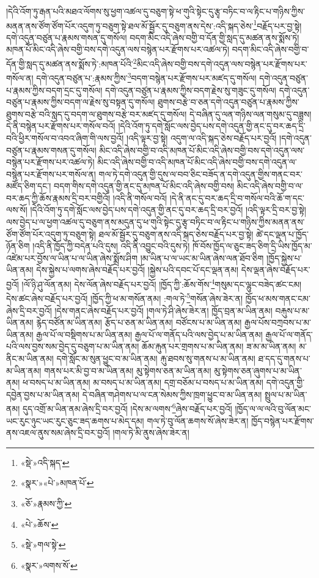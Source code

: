 །དེའི་འོག་ཏུ་རྒན་པའི་མཐའ་ལོགས་སུ་ཕྱག་འཚལ་དུ་བཅུག་སྟེ་ཕ་གུའི་སྟེང་དུ་རྩྭ་བཏིང་བ་ལ་རྟིང་པ་གཉིས་ཀྱིས་མནན་ནས་ཙོག་ཙོག་པོར་འདུག་ཏུ་བཅུག་སྟེ་ཐལ་མོ་སྦྱོར་དུ་བཅུག་ནས་དེས་:འདི་སྐད་ཅེས་\footnote{«སྡེ་»འདི་སྐད་}བརྗོད་པར་བྱ་སྟེ། དགེ་འདུན་བཙུན་པ་རྣམས་གསན་དུ་གསོལ། བདག་མིང་འདི་ཞེས་བགྱི་བ་དོན་གྱི་སླད་དུ་མཚན་ནས་སྨོས་ཏེ། མཁན་པོ་མིང་འདི་ཞེས་བགྱི་བས་དགེ་འདུན་ལས་བསྙེན་པར་རྫོགས་པར་འཚལ་ཏེ། བདག་མིང་འདི་ཞེས་བགྱི་བ་དོན་གྱི་སླད་དུ་མཚན་ནས་སྨོས་ཏེ་:མཁན་པོའི་\footnote{«སྣར་»«པེ་»མཁན་པོ་}མིང་འདི་ཞེས་བགྱི་བས་དགེ་འདུན་ལས་བསྙེན་པར་རྫོགས་པར་གསོལ་ན། དགེ་འདུན་བཙུན་པ་:རྣམས་ཀྱིས་\footnote{«ཅོ་»རྣམས་ཀྱི་}བདག་བསྙེན་པར་རྫོགས་པར་མཛད་དུ་གསོལ། དགེ་འདུན་བཙུན་པ་རྣམས་ཀྱིས་བདག་དྲང་དུ་གསོལ། དགེ་འདུན་བཙུན་པ་རྣམས་ཀྱིས་བདག་རྗེས་སུ་གཟུང་དུ་གསོལ། དགེ་འདུན་བཙུན་པ་རྣམས་ཀྱིས་བདག་ལ་རྗེས་སུ་བསྟན་དུ་གསོལ། ཐུགས་བརྩེ་བ་ཅན་དགེ་འདུན་བཙུན་པ་རྣམས་ཀྱིས་ཐུགས་བརྩེ་བའི་སླད་དུ་བདག་ལ་ཐུགས་བརྩེ་བར་མཛད་དུ་གསོལ། དེ་བཞིན་དུ་ལན་གཉིས་ལན་གསུམ་དུ་བཟླས། དེ་ནི་བསྙེན་པར་རྫོགས་པར་གསོལ་བའོ། །དེའི་འོག་ཏུ་དགེ་སློང་ལས་བྱེད་པས་དགེ་འདུན་གྱི་ནང་དུ་བར་ཆད་དྲི་བའི་ཕྱིར་གསོལ་བ་འབའ་ཞིག་གི་ལས་བྱའོ། །འདི་ལྟར་བྱ་སྟེ། འདུག་ལ་འདི་སྐད་ཅེས་བརྗོད་པར་བྱའོ། །དགེ་འདུན་བཙུན་པ་རྣམས་གསན་དུ་གསོལ། མིང་འདི་ཞེས་བགྱི་བ་འདི་མཁན་པོ་མིང་འདི་ཞེས་བགྱི་བས་དགེ་འདུན་ལས་བསྙེན་པར་རྫོགས་པར་འཚལ་ཏེ། མིང་འདི་ཞེས་བགྱི་བ་འདི་མཁན་པོ་མིང་འདི་ཞེས་བགྱི་བས་དགེ་འདུན་ལ་བསྙེན་པར་རྫོགས་པར་གསོལ་ན། གལ་ཏེ་དགེ་འདུན་གྱི་དུས་ལ་བབ་ཅིང་བཟོད་ན་དགེ་འདུན་གྱིས་གནང་བར་མཛོད་ཅིག་དང་། བདག་གིས་དགེ་འདུན་གྱི་ནང་དུ་མཁན་པོ་མིང་འདི་ཞེས་བགྱི་བས། མིང་འདི་ཞེས་བགྱི་བ་ལ་བར་ཆད་ཀྱི་ཆོས་རྣམས་དྲི་བར་བགྱིའོ། །འདི་ནི་གསོལ་བའོ། །དེ་ནི་ནང་དུ་བར་ཆད་དྲི་བ་གསོལ་བའི་ཆོ་ག་དང་ལས་སོ། །དེའི་འོག་ཏུ་དགེ་སློང་ལས་བྱེད་པས་དགེ་འདུན་གྱི་ནང་དུ་བར་ཆད་དྲི་བར་བྱའོ། །འདི་ལྟར་དྲི་བར་བྱ་སྟེ། ལས་བྱེད་པ་ལ་ཕྱག་འཚལ་དུ་བཅུག་ནས་མདུན་དུ་ཕ་གུའི་སྟེང་དུ་རྩྭ་བཏིང་བ་ལ་རྟིང་པ་གཉིས་ཀྱིས་མནན་ནས་ཙོག་ཙོག་པོར་འདུག་ཏུ་བཅུག་སྟེ། ཐལ་མོ་སྦྱོར་དུ་བཅུག་ནས་འདི་སྐད་ཅེས་བརྗོད་པར་བྱ་སྟེ། ཚེ་དང་ལྡན་པ་ཁྱོད་ཉོན་ཅིག །འདི་ནི་ཁྱོད་ཀྱི་བདེན་པའི་དུས། འདི་ནི་འབྱུང་བའི་དུས་ཏེ། ཁོ་བོས་ཁྱོད་ལ་ཅུང་ཟད་ཅིག་དྲི་ཡིས་ཁྱོད་མ་འཛེམ་པར་བྱོས་ལ་ཡིན་པ་ལ་ཡིན་ཞེས་སྨྲོས་ཤིག །མ་ཡིན་པ་ལ་ཡང་མ་ཡིན་ཞེས་ལན་ཐོབ་ཅིག །ཁྱོད་སྐྱེས་པ་ཡིན་ནམ། དེས་སྐྱེས་པ་ལགས་ཞེས་བརྗོད་པར་བྱའོ། །སྐྱེས་པའི་དབང་པོ་དང་ལྡན་ནམ། དེས་ལྡན་ཞེས་བརྗོད་པར་བྱའོ། །ལོ་ཉི་ཤུ་ལོན་ནམ། དེས་ལོན་ཞེས་བརྗོད་པར་བྱའོ། །ཁྱོད་ཀྱི་:ཆོས་གོས་\footnote{«པེ་»ཆོས་}གསུམ་དང་ལྷུང་བཟེད་ཚང་ངམ། དེས་ཚང་ཞེས་བརྗོད་པར་བྱའོ། །ཁྱོད་ཀྱི་ཕ་མ་གསོན་ནམ། :གལ་ཏེ་\footnote{«སྡེ་»གལ་སྟེ་}གསོན་ཞེས་ཟེར་ན། ཁྱོད་ཕ་མས་གནང་ངམ་ཞེས་དྲི་བར་བྱའོ། །དེས་གནང་ཞེས་བརྗོད་པར་བྱའོ། །གལ་ཏེ་ཤི་ཞེས་ཟེར་ན། ཁྱོད་བྲན་མ་ཡིན་ནམ། བརྐུས་པ་མ་ཡིན་ནམ། རྙེད་བཙོན་མ་ཡིན་ནམ། རྩོད་པ་ཅན་མ་ཡིན་ནམ། བཙོངས་པ་མ་ཡིན་ནམ། རྒྱལ་པོས་བཀྲབས་པ་མ་ཡིན་ནམ། རྒྱལ་པོ་ལ་བསྡིགས་པ་མ་ཡིན་ནམ། རྒྱལ་པོ་ལ་གནོད་པའི་ལས་བྱེད་པ་མ་ཡིན་ནམ། རྒྱལ་པོ་ལ་གནོད་པའི་ལས་བྱས་སམ་བྱེད་དུ་བཅུག་པ་མ་ཡིན་ནམ། ཆོམ་རྐུན་པར་གྲགས་པ་མ་ཡིན་ནམ། ཟ་མ་མ་ཡིན་ནམ། མ་ནིང་མ་ཡིན་ནམ། དགེ་སློང་མ་སུན་ཕྱུང་བ་མ་ཡིན་ནམ། རྐུ་ཐབས་སུ་གནས་པ་མ་ཡིན་ནམ། ཐ་དད་དུ་གནས་པ་མ་ཡིན་ནམ། གནས་པར་མི་བྱ་བ་མ་ཡིན་ནམ། མུ་སྟེགས་ཅན་མ་ཡིན་ནམ། མུ་སྟེགས་ཅན་ཞུགས་པ་མ་ཡིན་ནམ། ཕ་བསད་པ་མ་ཡིན་ནམ། མ་བསད་པ་མ་ཡིན་ནམ། དགྲ་བཅོམ་པ་བསད་པ་མ་ཡིན་ནམ། དགེ་འདུན་གྱི་དབྱེན་བྱས་པ་མ་ཡིན་ནམ། དེ་བཞིན་གཤེགས་པ་ལ་ངན་སེམས་ཀྱིས་ཁྲག་ཕྱུང་བ་མ་ཡིན་ནམ། སྤྲུལ་པ་མ་ཡིན་ནམ། དུད་འགྲོ་མ་ཡིན་ནམ་ཞེས་དྲི་བར་བྱའོ། །དེས་མ་ལགས་\footnote{«སྣར་»ལགས་སོ་}ཞེས་བརྗོད་པར་བྱའོ། །ཁྱོད་ལ་ལ་ལའི་བུ་ལོན་མང་ཡང་རུང་ཉུང་ཡང་རུང་ཅུང་ཟད་ཆགས་པ་མེད་དམ། གལ་ཏེ་བུ་ལོན་ཆགས་སོ་ཞེས་ཟེར་ན། ཁྱོད་བསྙེན་པར་རྫོགས་ནས་འཇལ་ནུས་སམ་ཞེས་དྲི་བར་བྱའོ། །གལ་ཏེ་མི་ནུས་ཞེས་ཟེར་ན། 